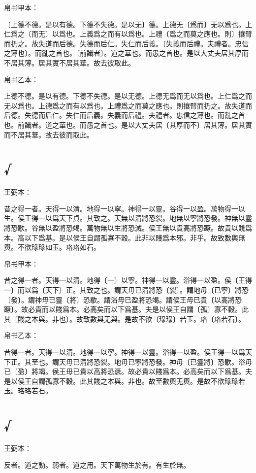 \documentclass[a5paper]{ctexbook}
\begin{document}
    
    帛书甲本：

    〔上德不德。是以有德。下德不失德。是以无〕德。上德无〔爲而〕无以爲也。上仁爲之〔而无〕以爲也。上義爲之而有以爲也。上禮〔爲之而莫之應也。則〕攘臂而扔之。故失道而后德。失德而后仁。失仁而后義。〔失義而后禮。夫禮者。忠信之薄也〕。而亂之首也。〔前識者〕。道之華也。而愚之首也。是以大丈夫居其厚而不居其薄。居其實不居其華。故去彼取此。

    帛书乙本：

    上德不德。是以有德。下德不失德。是以无德。上德无爲而无以爲也。上仁爲之而无以爲也。上德爲之而有以爲也。上禮爲之而莫之應也。則攘臂而扔之。故失道而后德。失德而后仁。失仁而后義。失義而后禮。夫禮者。忠信之薄也。而亂之首也。前識者。道之華也。而愚之首也。是以大丈夫居〔其厚而不〕居其薄。居其實而不居其華。故去彼而取此。

    \chapter{√}
    王弼本：

    昔之得一者。天得一以清。地得一以寧。神得一以靈。谷得一以盈。萬物得一以生。侯王得一以爲天下貞。其致之。天無以清將恐裂。地無以寧將恐發。神無以靈將恐歇。谷無以盈將恐竭。萬物無以生將恐滅。侯王無以貴高將恐蹶。故貴以賤爲本。高以下爲基。是以侯王自謂孤寡不穀。此非以賤爲本邪。非乎。故致數輿無輿。不欲琭琭如玉。珞珞如石。

    
    帛书甲本：

    昔之得一者。天得一以清。地得〔一〕以寧。神得一以靈。浴得一以盈。侯〔王得一〕而以爲〔天下〕正。其致之也。謂天毋已清將恐〔裂〕。謂地毋〔已寧〕將恐〔發〕。謂神毋已靈〔將〕恐歇。謂浴毋已盈將恐竭。謂侯王毋已貴〔以高將恐蹶〕。故必貴而以賤爲本。必高矣而以下爲基。夫是以侯王自謂〔孤〕寡不穀。此其〔賤之本與。非也〕。故致數與无與。是故不欲〔琭琭〕若玉。珞〔珞若石〕。

    帛书乙本：

    昔得一者。天得一以清。地得一以寧。神得一以靈。浴得一以盈。侯王得一以爲天下正。其至也。謂天毋已清將恐裂。地毋已寧將恐發。神毋〔已靈將〕恐歇。浴毋已〔盈〕將竭。侯王毋已貴以高將恐蹶。故必貴以賤爲本。必高矣而以下爲基。夫是以侯王自謂孤寡不穀。此其賤之本與。非也。故至數輿无輿。是故不欲琭琭若玉。珞珞若石。

    \chapter{√}
    王弼本：

    反者。道之動。弱者。道之用。天下萬物生於有。有生於無。
\end{document}
